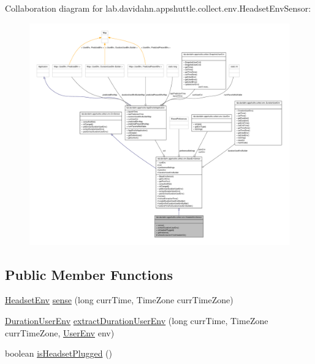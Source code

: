 \-Collaboration diagram for lab.\-davidahn.\-appshuttle.\-collect.\-env.\-Headset\-Env\-Sensor\-:
\nopagebreak
\begin{figure}[H]
\begin{center}
\leavevmode
\includegraphics[width=350pt]{classlab_1_1davidahn_1_1appshuttle_1_1collect_1_1env_1_1_headset_env_sensor__coll__graph}
\end{center}
\end{figure}
\subsection*{\-Public \-Member \-Functions}
\begin{DoxyCompactItemize}
\item 
\hyperlink{classlab_1_1davidahn_1_1appshuttle_1_1collect_1_1env_1_1_headset_env}{\-Headset\-Env} \hyperlink{classlab_1_1davidahn_1_1appshuttle_1_1collect_1_1env_1_1_headset_env_sensor_a6b10038196e782334595b4662ae18e60}{sense} (long curr\-Time, \-Time\-Zone curr\-Time\-Zone)
\item 
\hyperlink{classlab_1_1davidahn_1_1appshuttle_1_1collect_1_1env_1_1_duration_user_env}{\-Duration\-User\-Env} \hyperlink{classlab_1_1davidahn_1_1appshuttle_1_1collect_1_1env_1_1_headset_env_sensor_acd65dcea55efbd3121a0d0e8fd0ffb0f}{extract\-Duration\-User\-Env} (long curr\-Time, \-Time\-Zone curr\-Time\-Zone, \hyperlink{classlab_1_1davidahn_1_1appshuttle_1_1collect_1_1env_1_1_user_env}{\-User\-Env} env)
\item 
boolean \hyperlink{classlab_1_1davidahn_1_1appshuttle_1_1collect_1_1env_1_1_headset_env_sensor_aa364da064559893418093d20dc2c20ec}{is\-Headset\-Plugged} ()
\end{DoxyCompactItemize}
